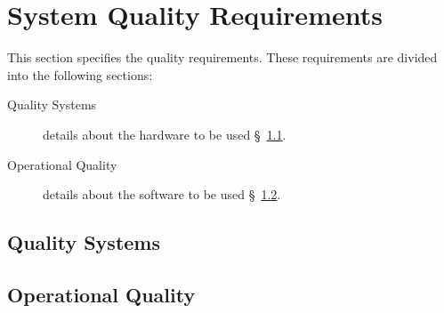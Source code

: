 \KNEADSECTIONNEWPAGE
\section{System Quality Requirements}
\label{lab:sec_Quality}
% 


This section specifies the \ThisSys quality requirements. These requirements are divided into the following sections:
\begin{description}
	\item[Quality Systems] details about the hardware to be used \S~\ref{lab:ssec_QualitySystems}. 
	\item[Operational Quality] details about the software to be used \S~\ref{lab:ssec_OperationalQuality}.
\end{description}

\subsection{Quality Systems}
\label{lab:ssec_QualitySystems}



\subsection{Operational Quality}
\label{lab:ssec_OperationalQuality}





% 




% 

